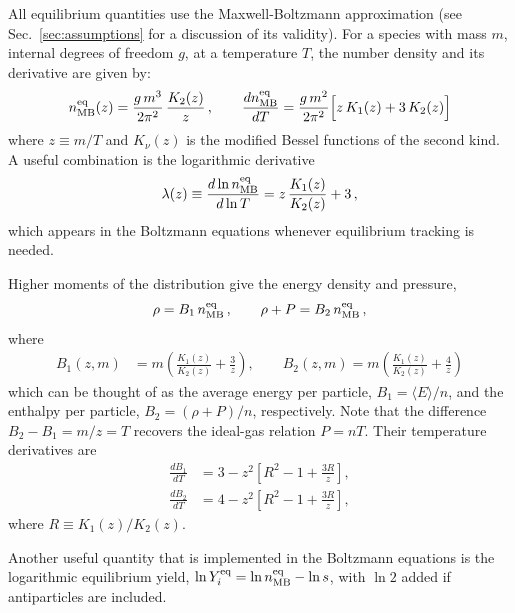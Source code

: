 \documentclass[11pt]{article}
\numberwithin{equation}{section}
\newcommand{\neqMB}{n^{\text{eq}}_{\rm MB}}
\begin{document}
All equilibrium quantities use the Maxwell-Boltzmann approximation (see Sec.~\ref{sec:assumptions} for a discussion of its validity). For a species with mass $m$, internal degrees of freedom $g$, at a temperature $T$, the number density and its derivative are given by:
\begin{equation}
    \neqMB(z) = \frac{g\,m^3}{2\pi^2}\,\frac{K_2(z)}{z}\,, \qquad
    \frac{d\neqMB}{dT} = \frac{g\,m^2}{2\pi^2}\Big[z\,K_1(z) + 3\,K_2(z)\Big]
\end{equation}
where $z\equiv m/T$ and $K_\nu(z)$ is the modified Bessel functions of the second kind. A useful combination is the logarithmic derivative
\begin{equation}
    \lambda(z) \equiv \frac{d\ln \neqMB}{d\ln T} = z\,\frac{K_1(z)}{K_2(z)} + 3\,,\label{eq:lambda}
\end{equation}
which appears in the Boltzmann equations whenever equilibrium tracking is needed.

Higher moments of the distribution give the energy density and pressure,
\begin{equation}
    \rho = B_1\,\neqMB \, , \qquad \rho + P = B_2\,\neqMB \, , \label{eq:MB_rho_P}
\end{equation}
where
\begin{align}
    B_1(z, m) &= m\!\left(\frac{K_1(z)}{K_2(z)} + \frac{3}{z}\right), \qquad
    B_2(z, m) = m\!\left(\frac{K_1(z)}{K_2(z)} + \frac{4}{z}\right) \label{eq:B1}
\end{align}
which can be thought of as the average energy per particle, $B_1 = \langle E\rangle / n$, and the enthalpy per particle, $B_2 = (\rho + P)/n$, respectively. Note that the difference $B_2 - B_1 = m/z = T$ recovers the ideal-gas relation $P = nT$. Their temperature derivatives are
\begin{align}
    \frac{dB_1}{dT} &= 3 - z^2\!\left[R^2 - 1 + \frac{3R}{z}\right], \label{eq:dB1dT} \\
    \frac{dB_2}{dT} &= 4 - z^2\!\left[R^2 - 1 + \frac{3R}{z}\right],\label{eq:dB2dT}
\end{align}
where $R \equiv K_1(z)/K_2(z)$.

Another useful quantity that is implemented in the Boltzmann equations is the logarithmic equilibrium yield, $\ln Y_i^{\text{eq}} = \ln \neqMB - \ln s$, with $\ln 2$ added if antiparticles are included.
\end{document}
